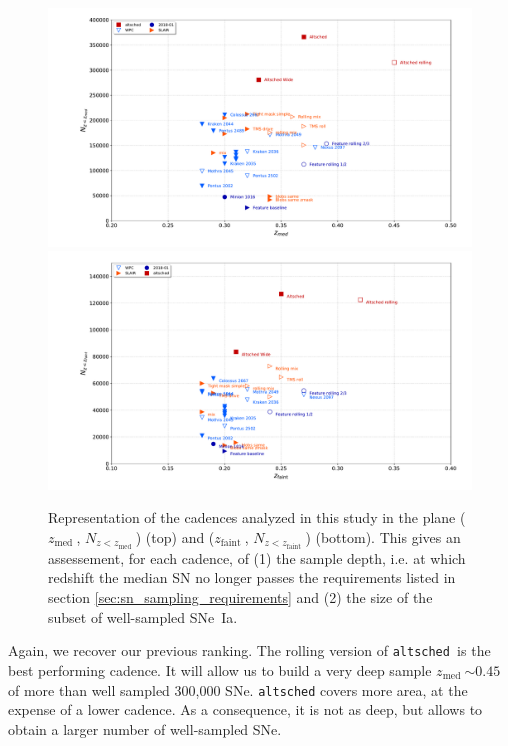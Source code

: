\documentclass[a4paper,10pt]{article}
\newcommand{\zfaint}{$z_{\mathrm{faint}}\ $}
\newcommand{\nsnfaint}{$N_{z<z_{\mathrm{faint}}}\ $}
\newcommand{\zmed}{$z_{\mathrm{med}}\ $}
\newcommand{\nsnmed}{$N_{z<z_{\mathrm{med}}}\ $}
\newcommand{\altsched}{{\tt altsched\ }}
\begin{document}
\begin{figure}[htbp]
  \begin{center}
    \includegraphics[width=\linewidth]{summary_plot_wfd_mediansn.pdf}
    \includegraphics[width=\linewidth]{summary_plot_wfd_faintsn.pdf}
    \caption{Representation of the cadences analyzed in this study in
      the plane (\zmed, \nsnmed) (top) and (\zfaint, \nsnfaint) (bottom). This gives an assessement, for each
      cadence, of (1) the sample depth, i.e. at which redshift the
      median SN no longer passes the requirements listed in section
      \ref{sec:sn_sampling_requirements} and (2) the size of the
      subset of well-sampled SNe~Ia.}
    \label{fig:nsn_zmax_med}
  \end{center}
\end{figure}

Again, we recover our previous ranking.  The rolling version of
\altsched is the best performing cadence.  It will allow us to build a
very deep sample \zmed $\sim 0.45$ of more than well sampled 300,000
SNe.  {\tt altsched} covers more area, at the expense of a lower
cadence.  As a consequence, it is not as deep, but allows to obtain a
larger number of well-sampled SNe.
\end{document}
